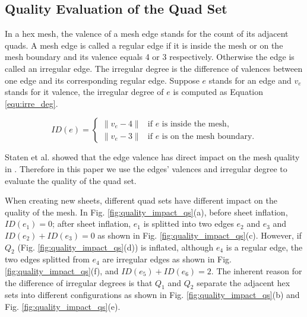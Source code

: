 \documentclass[final,5p,times,twocolumn]{elsarticle}
\begin{document}
\subsection{Quality Evaluation of the Quad Set}
\label{sec:quality_eval_qs}
In a hex mesh, the valence of a mesh edge stands for the count of its adjacent quads. A mesh edge is called a regular edge if it is inside the mesh or on the mesh boundary and its valence equals 4 or 3 respectively. Otherwise the edge is called an irregular edge. The irregular degree is the difference of valences between one edge and its corresponding regular edge. Suppose $e$ stands for an edge and $v_e$ stands for it valence, the irregular degree of $e$ is computed as Equation \ref{equ:irre_deg}.

\begin{equation}
\label{equ:irre_deg}
ID(e) =
 \begin{cases}
    \left \| v_e-4 \right \| & \text{if $e$ is inside the mesh,} \\
    \left \| v_e-3 \right \| & \text{if $e$ is on the mesh boundary.}
 \end{cases}
\end{equation}

Staten et al. showed that the edge valence has direct impact on the mesh quality in \cite{Staten2010d}. Therefore in this paper we use the edges' valences and irregular degree to evaluate the quality of the quad set.

When creating new sheets, different quad sets have different impact on the quality of the mesh. In Fig. \ref{fig:quality_impact_qs}(a), before sheet inflation, $ID(e_1)=0$; after sheet inflation, $e_1$ is splitted into two edges $e_2$ and $e_3$ and $ID(e_2)+ID(e_3)=0$ as shown in Fig. \ref{fig:quality_impact_qs}(c). However, if $Q_2$ (Fig. \ref{fig:quality_impact_qs}(d)) is inflated, although $e_4$ is a regular edge, the two edges splitted from $e_4$ are irregular edges as shown in Fig. \ref{fig:quality_impact_qs}(f), and $ID(e_5)+ID(e_6)=2$. The inherent reason for the difference of irregular degrees is that $Q_1$ and $Q_2$ separate the adjacent hex sets into different configurations as shown in Fig. \ref{fig:quality_impact_qs}(b) and Fig. \ref{fig:quality_impact_qs}(e).
\end{document}
